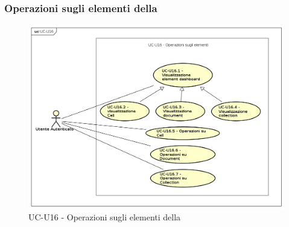 \subsubsection{Operazioni sugli elementi della }

    \begin{figure}[H]
      \begin{center}
        \includegraphics[width=12cm]{res/img/UCUtenti/UCUtenteA/UC-U16-Operazioni_sulle_righe/UC-U16.png}
      \caption{UC-U16 - Operazioni sugli elementi della }
      \end{center} 
    \end{figure}

